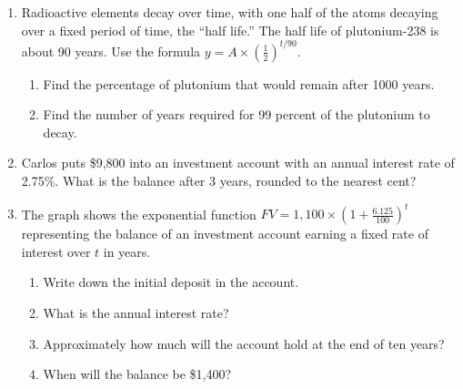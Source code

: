 \documentclass[12pt, twoside]{article}
\begin{document}
\begin{enumerate}
\begin{multicols}{2}
\begin{center}
    \end{center}
    \end{multicols}

\newpage
\subsubsection*{5.6 Exit Note: Simple interest rates}
\item Radioactive elements decay over time, with one half of the atoms decaying over a fixed period of time, the ``half life.'' The half life of plutonium-238 is about 90 years. Use the formula $\displaystyle y=A \times \left( \frac{1}{2} \right)^{t/90}$. 
\begin{enumerate}[itemsep=1.5cm]
    \item Find the percentage of plutonium that would remain after 1000 years.
    \item Find the number of years required for 99 percent of the plutonium to decay.
\end{enumerate}


\item Carlos puts \$9,800 into an investment account with an annual interest rate of 2.75\%. What is the balance after 3 years, rounded to the nearest cent? \vspace{2cm}

\item The graph shows the exponential function $\displaystyle FV=1,100 \times \left( 1+\frac{6.125}{100} \right)^t$ representing the balance of an investment account earning a fixed rate of interest over $t$ in years.
\begin{multicols}{2}
    \begin{enumerate}[itemsep=1cm]
        \item Write down the initial deposit in the account.
        \item What is the annual interest rate?
        \item Approximately how much will the account hold at the end of ten years?
        \item When will the balance be \$1,400?
    \end{enumerate}
    \begin{center}
\end{center}
\end{multicols}
\end{enumerate}
\end{document}
